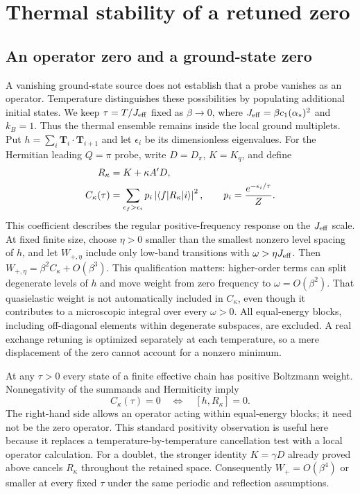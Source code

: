 \section{Thermal stability of a retuned zero}
\label{sec:thermal}

\subsection{An operator zero and a ground-state zero}

A vanishing ground-state source does not establish that a probe vanishes as
an operator. Temperature distinguishes these possibilities by populating
additional initial states. We keep $\tau=T/J_{\rm eff}$ fixed as
$\beta\to0$, where $J_{\rm eff}=\beta c_1(\alpha_*)^2$ and $k_B=1$.
Thus the thermal ensemble remains inside the local ground multiplets.
Put $h=\sum_i\bm T_i\cdot\bm T_{i+1}$ and let $\epsilon_i$ be its
dimensionless eigenvalues. For the Hermitian leading $Q=\pi$ probe,
write $D=D_\pi$, $K=K_q$, and define
\begin{align}
 R_\kappa&=K+\kappa A'D,\notag\\
 C_\kappa(\tau)&=\sum_{\epsilon_f>\epsilon_i}
 p_i\left|\langle f|R_\kappa|i\rangle\right|^2,
 \qquad p_i=\frac{e^{-\epsilon_i/\tau}}{Z}.
 \label{eq:thermal-weight}
\end{align}
This coefficient describes the regular positive-frequency response on the
$J_{\rm eff}$ scale. At fixed finite size, choose $\eta>0$ smaller than
the smallest nonzero level spacing of $h$, and let $W_{+,\eta}$ include
only low-band transitions with $\omega>\eta J_{\rm eff}$. Then
$W_{+,\eta}=\beta^2C_\kappa+O(\beta^3)$. This qualification matters:
higher-order terms can split degenerate levels of $h$ and move weight
from zero frequency to $\omega=O(\beta^2)$. That quasielastic weight is
not automatically included in $C_\kappa$, even though it contributes to
a microscopic integral over every $\omega>0$.
All equal-energy blocks, including off-diagonal elements within degenerate
subspaces, are excluded. A real exchange retuning is optimized separately
at each temperature, so a mere displacement of the zero cannot account for
a nonzero minimum.

At any $\tau>0$ every state of a finite effective chain has positive
Boltzmann weight. Nonnegativity of the summands and Hermiticity imply
\begin{equation}
 C_\kappa(\tau)=0\quad\Longleftrightarrow\quad[h,R_\kappa]=0.
 \label{eq:thermal-criterion}
\end{equation}
The right-hand side allows an operator acting within equal-energy blocks;
it need not be the zero operator. This standard positivity observation is
useful here because it replaces a temperature-by-temperature cancellation
test with a local operator calculation. For a doublet, the stronger identity
$K=\gamma D$ already proved above cancels $R_\kappa$ throughout the
retained space. Consequently $W_+=O(\beta^4)$ or smaller at every fixed
$\tau$ under the same periodic and reflection assumptions.

